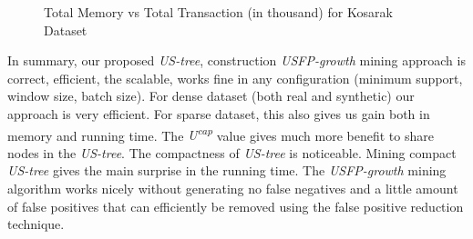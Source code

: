 \documentclass[conference]{IEEEtran}
\begin{document}
            \begin{figure}[h]
            \centering
                
            \caption{Total Memory vs Total Transaction (in thousand) for Kosarak Dataset }
            \label{result:g_k_memory_node}
            \end{figure}

In summary, our proposed \emph{US-tree}, construction \emph{USFP-growth} mining approach is correct, efficient, the scalable, works fine in any configuration (minimum support, window size, batch size). For dense dataset (both real and synthetic) our approach is very efficient. For sparse dataset, this also gives us gain both in memory and running time. The \emph{U\textsuperscript{cap}} value gives much more benefit to share nodes in the \emph{US-tree}. The compactness of \emph{US-tree} is noticeable. Mining compact \emph{US-tree} gives the main surprise in the running time. The \emph{USFP-growth} mining algorithm works nicely without generating no false negatives and a little amount of false positives that can efficiently be removed using the false positive reduction technique.
\end{document}
